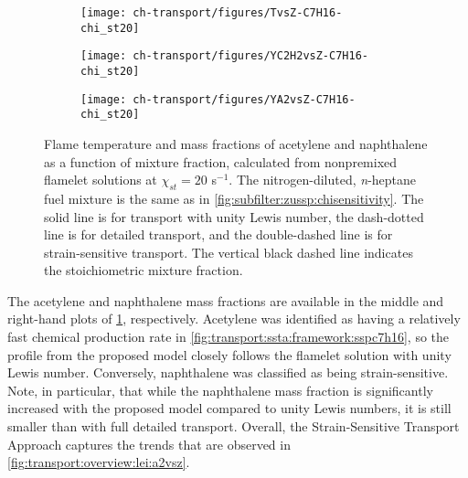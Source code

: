 
\begin{figure}[ht]
  \centering
  \begin{subfigure}[b]{0.33\linewidth}
    \texttt{[image: ch-transport/figures/TvsZ-C7H16-chi\_st20]}
  \end{subfigure}%
  \begin{subfigure}[b]{0.33\linewidth}
    \texttt{[image: ch-transport/figures/YC2H2vsZ-C7H16-chi\_st20]}
  \end{subfigure}%
  \begin{subfigure}[b]{0.33\linewidth}
    \texttt{[image: ch-transport/figures/YA2vsZ-C7H16-chi\_st20]}
  \end{subfigure}
  \caption[\texorpdfstring{$T$}{T}, \texorpdfstring{$Y_{\ce{C2H2}}$}{YC2H2}, and \texorpdfstring{$Y_{\text{A2}}$}{YA2} for Various Transport Approaches Within a / Mixture]{Flame temperature and mass fractions of acetylene and naphthalene as a function of mixture fraction, calculated from nonpremixed flamelet solutions at $\chi_{st} = 20$ s$^{-1}$. The nitrogen-diluted, \textit{n}-heptane fuel mixture is the same as in \cref{fig:subfilter:zussp:chisensitivity}. The solid line is for transport with unity Lewis number, the dash-dotted line is for detailed transport, and the double-dashed line is for strain-sensitive transport. The vertical black dashed line indicates the stoichiometric mixture fraction.}
  \label{fig:transport:ssta:dns:tc2h2a2vsz}
\end{figure}

The acetylene and naphthalene mass fractions are available in the middle and right-hand plots of \cref{fig:transport:ssta:dns:tc2h2a2vsz}, respectively. Acetylene was identified as having a relatively fast chemical production rate in \cref{fig:transport:ssta:framework:sspc7h16}, so the profile from the proposed model closely follows the flamelet solution with unity Lewis number. Conversely, naphthalene was classified as being strain-sensitive. Note, in particular, that while the naphthalene mass fraction is significantly increased with the proposed model compared to unity Lewis numbers, it is still smaller than with full detailed transport. Overall, the Strain-Sensitive Transport Approach captures the trends that are observed in \cref{fig:transport:overview:lei:a2vsz}. 


